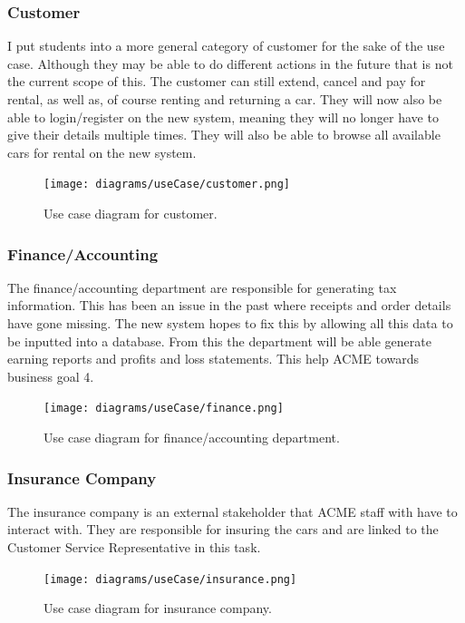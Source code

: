     \subsubsection{Customer}
      I put students into a more general category of customer for the sake of the use case. Although they may be able to do different actions in the future
      that is not the current scope of this. The customer can still extend, cancel and pay for rental, as well as, of course renting and returning a car.
      They will now also be able to login/register on the new system, meaning they will no longer have to give their details multiple times. They will also 
      be able to browse all available cars for rental on the new system.  
      \begin{figure}[H]
        \centering
        \texttt{[image: diagrams/useCase/customer.png]}
        \caption{Use case diagram for customer.}
        \label{fig:UCcustomer}
      \end{figure}
    
    \subsubsection{Finance/Accounting}
      The finance/accounting department are responsible for generating tax information. This has been an issue in the past where
      receipts and order details have gone missing. The new system hopes to fix this by allowing all this data to be inputted into 
      a database. From this the department will be able generate earning reports and profits and loss statements. This help ACME 
      towards business goal 4.
      \begin{figure}[H]
        \centering
        \texttt{[image: diagrams/useCase/finance.png]}
        \caption{Use case diagram for finance/accounting department.}
        \label{fig:UCaccounting}
      \end{figure}

    \subsubsection{Insurance Company}
      The insurance company is an external stakeholder that ACME staff with have to interact with. They are responsible for insuring the cars and
      are linked to the Customer Service Representative in this task.
      \begin{figure}[H]
        \centering
        \texttt{[image: diagrams/useCase/insurance.png]}
        \caption{Use case diagram for insurance company.}
        \label{fig:UCinsurance}
      \end{figure}
      

